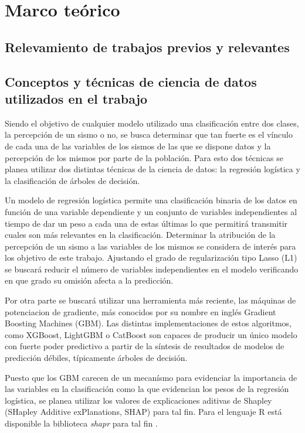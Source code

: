 \documentclass[a4paper]{report}
\begin{document}
\chapter{Marco teórico}

\section{Relevamiento de trabajos previos y relevantes}





\section{Conceptos y técnicas de ciencia de datos utilizados en el trabajo}
Siendo el objetivo de cualquier modelo utilizado una clasificación entre dos clases, la percepción de un sismo o no, se busca determinar que tan fuerte es el vínculo de cada una de las variables de los sismos de las que se dispone datos y la percepción de los mismos por parte de la población.
Para esto dos técnicas se planea utilizar dos distintas técnicas de la ciencia de datos: la regresión logística y la clasificación de árboles de decisión. 

Un modelo de regresión logística permite una clasificación binaria de los datos en función de una variable dependiente y un conjunto de variables independientes al tiempo de dar un peso a cada una de estas últimas lo que permitirá transmitir cuales son más relevantes en la clasificación.
Determinar la atribución de la percepción de un sismo a las variables de los mismos se considera de interés para los objetivo de este trabajo. 
Ajustando el grado de regularización tipo Lasso (L1) se buscará reducir el número de variables independientes en el modelo verificando en que grado su omisión afecta a la predicción.

Por otra parte se buscará utilizar una herramienta más reciente, las máquinas de potenciacion de gradiente, más conocidos por su nombre en inglés Gradient Boosting Machines (GBM).
Las distintas implementaciones de estos algoritmos, como XGBoost, LightGBM o CatBoost son capaces de producir un único modelo con fuerte poder predictivo a partir de la síntesis de resultados de modelos de predicción débiles, típicamente árboles de decisión. 

Puesto que los GBM carecen de un mecanísmo para evidenciar la importancia de las variables en la clasificación como la que evidencian los pesos de la regresión logística, se planea utilizar los valores de explicaciones aditivas de Shapley (SHapley Additive exPlanations, SHAP) para tal fin.
Para el lenguaje R está disponible la biblioteca \emph{shapr} para tal fin \cite{camilla_lingjaerde_shapr_nodate}.
\end{document}
